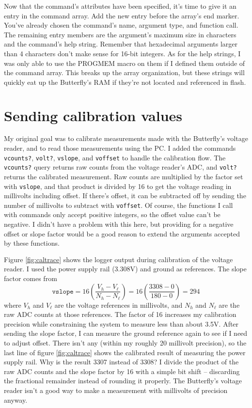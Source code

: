 Now that the command's attributes have been specified, it's time to give it an entry in the command array.  Add the new entry before the array's end marker.  You've already chosen the command's name, argument type, and function call.  The remaining entry members are the argument's maximum size in characters and the command's help string.  Remember that hexadecimal arguments larger than 4 characters don't make sense for 16-bit integers.  As for the help strings, I was only able to use the PROGMEM macro on them if I defined them outside of the command array.  This breaks up the array organization, but these strings will quickly eat up the Butterfly's RAM if they're not located and referenced in flash.  

\clearpage{}
\section{Sending calibration values}
My original goal was to calibrate measurements made with the Butterfly's voltage reader, and to read those measurements using the PC.  I added the commands \texttt{vcounts?}, \texttt{volt?}, \texttt{vslope}, and \texttt{voffset} to handle the calibration flow.  The \texttt{vcounts?} query returns raw counts from the voltage reader's ADC, and \texttt{volt?} returns the calibrated measurement.  Raw counts are multiplied by the factor set with \texttt{vslope}, and that product is divided by 16 to get the voltage reading in millivolts including offset.  If there's offset, it can be subtracted off by sending the number of millivolts to subtract with \texttt{voffset}.  Of course, the functions I call with commands only accept positive integers, so the offset value can't be negative.  I didn't have a problem with this here, but providing for a negative offset or slope factor would be a good reason to extend the arguments accepted by these functions.

Figure \ref{fig:caltrace} shows the logger output during calibration of the voltage reader.  I used the power supply rail (3.308V) and ground as references.  The slope factor comes from
\begin{equation}
    \mathtt{vslope} = 16 \left( \frac{V_h - V_{\ell}}{N_h - N_{\ell}} \right) =
        16 \left( \frac{3308 - 0}{180 - 0} \right) = 294
\end{equation}
where $V_h$ and $V_{\ell}$ are the voltage references in millivolts, and $N_h$ and $N_{\ell}$ are the raw ADC counts at those references.  The factor of 16 increases my calibration precision while constraining the system to measure less than about 3.5V.  After sending the slope factor, I can measure the ground reference again to see if I need to adjust offset.  There isn't any (within my roughly 20 millivolt precision), so the last line of figure \ref{fig:caltrace} shows the calibrated result of measuring the power supply rail.  Why is the result 3307 instead of 3308?  I divide the product of the raw ADC counts and the slope factor by 16 with a simple bit shift -- discarding the fractional remainder instead of rounding it properly.  The Butterfly's voltage reader isn't a good way to make a measurement with millivolts of precision anyway.      

